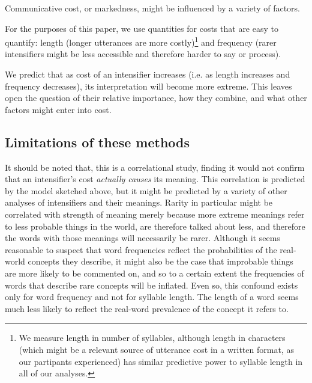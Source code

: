\documentclass[10pt,letterpaper]{article}
\begin{document}

Communicative cost, or markedness,
might be influenced by a variety of factors.

For the purposes of this paper, we use quantities for costs that are easy to quantify: length (longer utterances are more costly)\footnote{We measure length in number of syllables, although length in characters (which might be a relevant source of utterance cost in a written format, as our partipants experienced) has similar
predictive power to syllable length in all of our analyses.}
and frequency (rarer intensifiers might be less accessible and therefore harder to say or process).

We predict that as cost of an intensifier increases (i.e. as length increases and frequency decreases), its interpretation will become more extreme. This leaves open the question of their relative importance,
how they combine,
and what other factors %
might enter into cost.

\subsection{Limitations of these methods}
It should be noted that, this is a correlational study, finding it would not confirm that an intensifier's cost \emph{actually causes} its meaning. This correlation is predicted by the model sketched above, but it might be predicted by a variety of other analyses of intensifiers and their meanings. Rarity in particular might be correlated with strength of meaning merely because more extreme meanings refer to less probable things in the world, are therefore talked about less, and therefore the words with those meanings will necessarily be rarer. Although it seems reasonable to suspect that word frequencies reflect the probabilities of the real-world concepts they describe, it might also be the case that improbable things are more likely to be commented on, and so to a certain extent the frequencies of words that describe rare concepts will be inflated. Even so, this confound exists only for word frequency and not for syllable length.
The length of a word seems much less likely to reflect the real-word prevalence of the concept it refers to.
\end{document}
